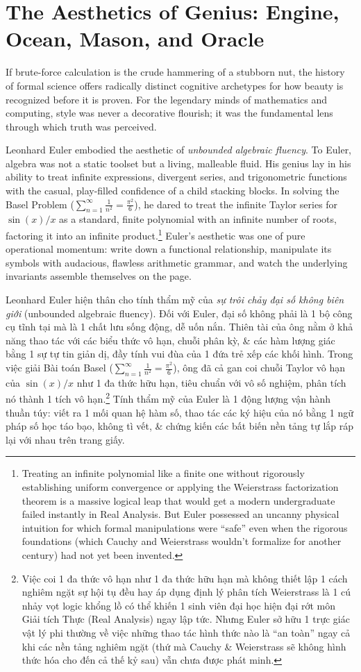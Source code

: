 \documentclass[11pt]{article}
\begin{document}
\section{The Aesthetics of Genius: Engine, Ocean, Mason, and Oracle}
If brute-force calculation is the crude hammering of a stubborn nut, the history of formal science offers radically distinct cognitive archetypes for how beauty is recognized before it is proven. For the legendary minds of mathematics and computing, style was never a decorative flourish; it was the fundamental lens through which truth was perceived.

Leonhard Euler embodied the aesthetic of \emph{unbounded algebraic fluency}. To Euler, algebra was not a static toolset but a living, malleable fluid. His genius lay in his ability to treat infinite expressions, divergent series, and trigonometric functions with the casual, play-filled confidence of a child stacking blocks. In solving the Basel Problem ($\sum_{n=1}^\infty \frac{1}{n^2} = \frac{\pi^2}{6}$), he dared to treat the infinite Taylor series for $\sin(x)/x$ as a standard, finite polynomial with an infinite number of roots, factoring it into an infinite product.\footnote{Treating an infinite polynomial like a finite one without rigorously establishing uniform convergence or applying the Weierstrass factorization theorem is a massive logical leap that would get a modern undergraduate failed instantly in Real Analysis. But Euler possessed an uncanny physical intuition for which formal manipulations were ``safe'' even when the rigorous foundations (which Cauchy and Weierstrass wouldn't formalize for another century) had not yet been invented.} Euler's aesthetic was one of pure operational momentum: write down a functional relationship, manipulate its symbols with audacious, flawless arithmetic grammar, and watch the underlying invariants assemble themselves on the page.

Leonhard Euler hiện thân cho tính thẩm mỹ của \emph{sự trôi chảy đại số không biên giới} (unbounded algebraic fluency). Đối với Euler, đại số không phải là 1 bộ công cụ tĩnh tại mà là 1 chất lưu sống động, dễ uốn nắn. Thiên tài của ông nằm ở khả năng thao tác với các biểu thức vô hạn, chuỗi phân kỳ, \& các hàm lượng giác bằng 1 sự tự tin giản dị, đầy tính vui đùa của 1 đứa trẻ xếp các khối hình. Trong việc giải Bài toán Basel ($\sum_{n=1}^\infty \frac{1}{n^2} = \frac{\pi^2}{6}$), ông đã cả gan coi chuỗi Taylor vô hạn của $\sin(x)/x$ như 1 đa thức hữu hạn, tiêu chuẩn với vô số nghiệm, phân tích nó thành 1 tích vô hạn.\footnote{Việc coi 1 đa thức vô hạn như 1 đa thức hữu hạn mà không thiết lập 1 cách nghiêm ngặt sự hội tụ đều hay áp dụng định lý phân tích Weierstrass là 1 cú nhảy vọt logic khổng lồ có thể khiến 1 sinh viên đại học hiện đại rớt môn Giải tích Thực (Real Analysis) ngay lập tức. Nhưng Euler sở hữu 1 trực giác vật lý phi thường về việc những thao tác hình thức nào là ``an toàn'' ngay cả khi các nền tảng nghiêm ngặt (thứ mà Cauchy \& Weierstrass sẽ không hình thức hóa cho đến cả thế kỷ sau) vẫn chưa được phát minh.} Tính thẩm mỹ của Euler là 1 động lượng vận hành thuần túy: viết ra 1 mối quan hệ hàm số, thao tác các ký hiệu của nó bằng 1 ngữ pháp số học táo bạo, không tì vết, \& chứng kiến các bất biến nền tảng tự lắp ráp lại với nhau trên trang giấy.
\end{document}
